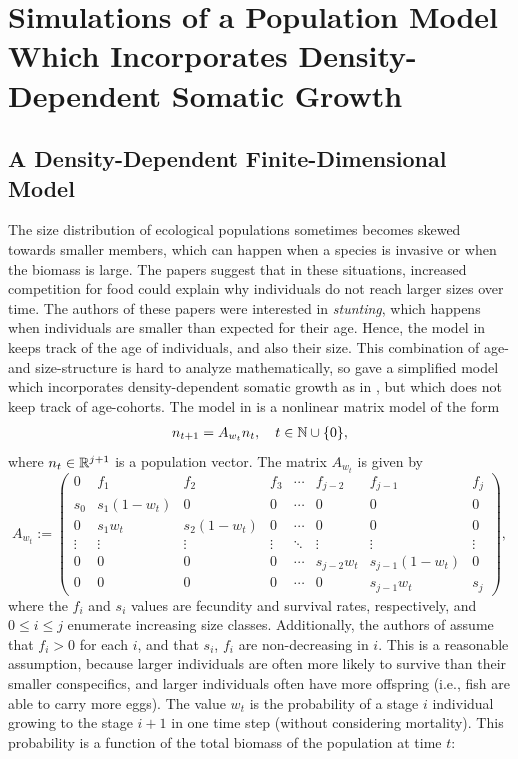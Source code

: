 \chapter{Simulations of a Population Model Which Incorporates Density-Dependent Somatic Growth}

\section{A Density-Dependent Finite-Dimensional Model} \label{section:finitedim}

The size distribution of ecological populations sometimes becomes skewed towards smaller members, which can happen when a species is invasive or when the biomass is large. The papers \cite{Chizinski2010, Ylikarjula1999} suggest that in these situations, increased competition for food could explain why individuals do not reach larger sizes over time. The authors of these papers were interested in \emph{stunting}, which happens when individuals are smaller than expected for their age. Hence, the model in \cite{Chizinski2010, Ylikarjula1999} keeps track of the age of individuals, and also their size. This combination of age- and size-structure is hard to analyze mathematically, so \cite{Callahan2019} gave a simplified model which incorporates density-dependent somatic growth as in \cite{Chizinski2010, Ylikarjula1999}, but which does not keep track of age-cohorts. The model in \cite{Callahan2019} is a nonlinear matrix model of the form
\begin{align}
	n_{t+1} = A_{w_t} n_t, \quad t \in \mathbb{N} \cup \{0\}, \label{eqn:matrixsystem}
\end{align}
where $n_t \in \mathbb{R}^{j+1}$ is a population vector. The matrix $A_{w_t}$ is given by
\[A_{w_t}:= \begin{pmatrix}
0 & f_1 & f_2 & f_3 & \cdots & f_{j-2} & f_{j-1} & f_j \\
s_0 & s_1(1-w_t) & 0 & 0 & \cdots & 0 & 0 & 0 \\
0 & s_1 w_t & s_2(1 - w_t) & 0 & \cdots & 0 & 0 & 0 \\
\vdots & \vdots & \vdots & \vdots & \ddots & \vdots & \vdots & \vdots \\
0 & 0 & 0 & 0 &\cdots & s_{j-2} w_t & s_{j-1} (1- w_t) & 0 \\
0 & 0 & 0 & 0 & \cdots & 0 & s_{j-1} w_t & s_j
\end{pmatrix},\]
where the $f_i$ and $s_i$ values are fecundity and survival rates, respectively, and $0 \leq i \leq j$ enumerate increasing size classes. Additionally, the authors of \cite{Callahan2019} assume that $f_i>0$ for each $i$, and that $s_i$, $f_i$ are non-decreasing in $i$. This is a reasonable assumption, because larger individuals are often more likely to survive than their smaller conspecifics, and larger  individuals often have more offspring (i.e., fish are able to carry more eggs). The value $w_t$ is the probability of a stage $i$ individual growing to the stage $i+1$ in one time step (without considering mortality). This probability is a function of the total biomass of the population at time $t$:
